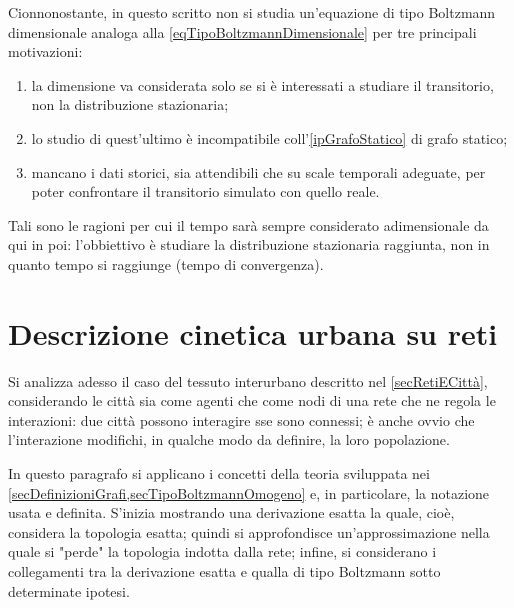                 Cionnonostante, in questo scritto non si studia un'equazione di tipo Boltzmann dimensionale analoga alla \cref{eqTipoBoltzmannDimensionale} per tre principali motivazioni:

                \begin{enumerate}[
                    label=\arabic*.,
                    itemsep=0.1em,
                ]
                    \item la dimensione va considerata solo se si è interessati a studiare il transitorio, non la distribuzione stazionaria;
                    \item lo studio di quest'ultimo è incompatibile coll'\cref{ipGrafoStatico} di grafo statico; 
                    \item mancano i dati storici, sia attendibili che su scale temporali adeguate, per poter confrontare il transitorio simulato con quello reale.
                \end{enumerate}

                Tali sono le ragioni per cui il tempo sarà sempre considerato adimensionale da qui in poi: l'obbiettivo è studiare la distribuzione stazionaria raggiunta, non in quanto tempo si raggiunge (tempo di convergenza).

    \section{Descrizione cinetica urbana su reti}\label{secDescrizioneCineticaUrbana} %
    
        Si analizza adesso il caso del tessuto interurbano descritto nel \cref{secRetiECittà}, considerando le città sia come agenti che come nodi di una rete che ne regola le interazioni: due città possono interagire sse sono connessi; è anche ovvio che l'interazione modifichi, in qualche modo da definire, la loro popolazione.

        In questo paragrafo si applicano i concetti della teoria sviluppata nei \cref{secDefinizioniGrafi,secTipoBoltzmannOmogeno} e, in particolare, la notazione usata e definita. S'inizia mostrando una derivazione esatta la quale, cioè, considera la topologia esatta; quindi si approfondisce un'approssimazione nella quale si "perde" la topologia indotta dalla rete; infine, si considerano i collegamenti tra la derivazione esatta e qualla di tipo Boltzmann sotto determinate ipotesi.

